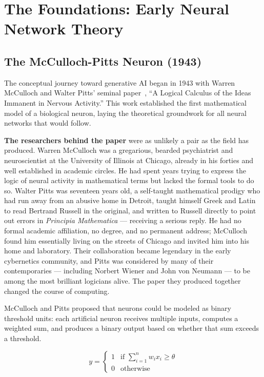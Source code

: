 \documentclass{book}
\begin{document}
\section{The Foundations: Early Neural Network Theory}

\subsection{The McCulloch-Pitts Neuron (1943)}
\label{sec:mcp}

The conceptual journey toward generative AI began in 1943 with Warren
McCulloch and Walter Pitts' seminal paper~\cite{mcculloch1943logical},
``A Logical Calculus of the Ideas Immanent in Nervous Activity.'' This work
established the first mathematical model of a biological neuron, laying the
theoretical groundwork for all neural networks that would follow.

\textbf{The researchers behind the paper} were as unlikely a pair as the
field has produced. Warren McCulloch was a gregarious, bearded psychiatrist
and neuroscientist at the University of Illinois at Chicago, already in his forties and
well established in academic circles. He had spent years trying to express the
logic of neural activity in mathematical terms but lacked the formal tools to
do so. Walter Pitts was seventeen years old, a self-taught mathematical
prodigy who had run away from an abusive home in Detroit, taught himself
Greek and Latin to read Bertrand Russell in the original, and written to
Russell directly to point out errors in \textit{Principia Mathematica} ---
receiving a serious reply. He had no formal academic affiliation, no degree,
and no permanent address; McCulloch found him essentially living on the
streets of Chicago and invited him into his home and laboratory. Their
collaboration became legendary in the early cybernetics community, and Pitts
was considered by many of their contemporaries --- including Norbert Wiener
and John von Neumann --- to be among the most brilliant logicians alive.
The paper they produced together changed the course of computing.

McCulloch and Pitts proposed that neurons could be modeled as binary
threshold units: each artificial neuron receives multiple inputs, computes a
weighted sum, and produces a binary output based on whether that sum exceeds
a threshold.

\begin{equation}
\label{eq:mcp}
y = \begin{cases}
1 & \text{if } \displaystyle\sum_{i=1}^{n} w_i x_i \geq \theta \\[6pt]
0 & \text{otherwise}
\end{cases}
\end{equation}
\end{document}
